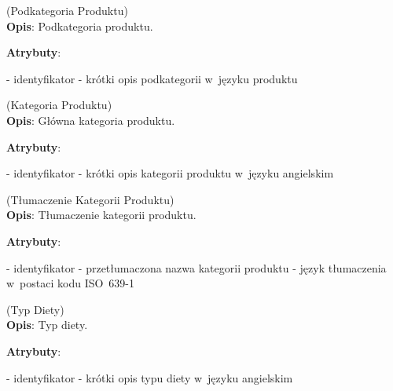 \begin{enumerate}[label={\textbf{KAT/2/\protect\twodigits{\theenumi}}}, wide, labelwidth=!, labelindent=0pt, labelsep=0pt, series=reqs]
    \label{kat:ProductSubcategory} (Podkategoria Produktu)\\
    \indent\textbf{Opis}: Podkategoria produktu.
    \par
    \textbf{Atrybuty}:
    \begin{itemize}[series=atr, wide, align=left, leftmargin=190pt]
        \label{kat:ProductSubcategory:id}- identyfikator
        \label{kat:ProductSubcategory:description}- krótki opis podkategorii w~języku produktu
    \end{itemize}

    \label{kat:ProductCategory} (Kategoria Produktu)\\
    \indent\textbf{Opis}: Główna kategoria produktu.
    \par
    \textbf{Atrybuty}:
    \begin{itemize}[series=atr, wide, align=left, leftmargin=190pt]
        \label{kat:ProductCategory:id}- identyfikator
        \label{kat:ProductCategory:description}- krótki opis kategorii produktu w~języku angielskim
    \end{itemize}

    \label{kat:ProductCategoryTranslation} (Tłumaczenie Kategorii Produktu)\\
    \indent\textbf{Opis}: Tłumaczenie kategorii produktu.
    \par
    \textbf{Atrybuty}:
    \begin{itemize}[series=atr, wide, align=left, leftmargin=190pt]
        \label{kat:ProductCategoryTranslation:id}- identyfikator
        \label{kat:ProductCategoryTranslation:translation}- przetłumaczona nazwa kategorii produktu
        \label{kat:ProductCategoryTranslation:language}- język tłumaczenia w~postaci kodu ISO~639-1
    \end{itemize}

    \label{kat:DietType} (Typ Diety)\\
    \indent\textbf{Opis}: Typ diety.
    \par
    \textbf{Atrybuty}:
    \begin{itemize}[series=atr, wide, align=left, leftmargin=190pt]
        \label{kat:DietType:id}- identyfikator
        \label{kat:DietType:name}- krótki opis typu diety w~języku angielskim
    \end{itemize}


\end{enumerate}
